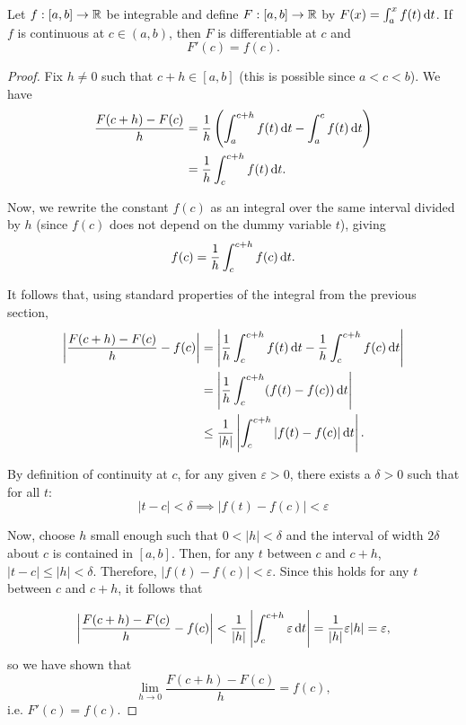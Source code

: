 \documentclass[../analysis1.tex]{subfiles}
\begin{document}
\begin{theorem}
\label{thm:ftc1}
    \begin{shaded*}
        Let $f:[a,b]\to\mathbb{R}$ be integrable and define $F:[a,b]\to\mathbb{R}$ by $F(x)=\int_a^x f(t)\d{t}$. If $f$ is continuous at $c\in (a,b)$, then $F$ is differentiable at $c$ and
        \[F'(c)=f(c).\] 
    \end{shaded*}
\end{theorem}
\begin{proof}
    Fix $h \neq 0$ such that $c+h \in [a,b]$ (this is possible since $a<c<b$). We have
    \begin{align*}
    \frac{F(c+h) - F(c)}{h} &= \frac{1}{h} \left( \int_a^{c+h} f(t) \d t - \int_a^c f(t) \d t \right)\\ 
    &= \frac{1}{h} \int_c^{c+h} f(t) \d t.
    \end{align*} 
    
    Now, we rewrite the constant $f(c)$ as an integral over the same interval divided by $h$ (since $f(c)$ does not depend on the dummy variable $t$), giving
    \[ f(c) = \frac{1}{h} \int_c^{c+h} f(c) \d t. \]
    
    It follows that, using standard properties of the integral from the previous section,
    \begin{align*}
    \left| \frac{F(c+h) - F(c)}{h} - f(c) \right| &= \left| \frac{1}{h} \int_c^{c+h} f(t) \d t - \frac{1}{h} \int_c^{c+h} f(c) \d t \right| \\
     &= \left| \frac{1}{h} \int_c^{c+h} (f(t) - f(c)) \d t \right|\\
     &\le \frac{1}{|h|}\left| \int_c^{c+h} |f(t) - f(c)| \d t\right|.
    \end{align*}
    
    By definition of continuity at $c$, for any given $\varepsilon > 0$, there exists a $\delta > 0$ such that for all $t$:
    \[ |t - c| < \delta \implies |f(t) - f(c)| < \varepsilon \]
    
    Now, choose $h$ small enough such that $0 < |h| < \delta$ and the interval of width $2\delta$ about $c$ is contained in $[a,b]$. Then, for any $t$ between $c$ and $c+h$, $|t - c|\le |h|<\delta$. Therefore, $|f(t) - f(c)|<\varepsilon$. Since this holds for any $t$ between $c$ and $c+h$, it follows that
    
    \[\left| \frac{F(c+h) - F(c)}{h} - f(c) \right|< \frac{1}{|h|}\left|\int_c^{c+h}\varepsilon\d{t} \right|=\frac{1}{|h|}\varepsilon|h|=\varepsilon,\]
    so we have shown that \[\lim_{h\to 0}\frac{F(c+h)-F(c)}{h}=f(c),\]
    i.e. $F'(c)=f(c)$.\qedhere
\end{proof}
\end{document}
